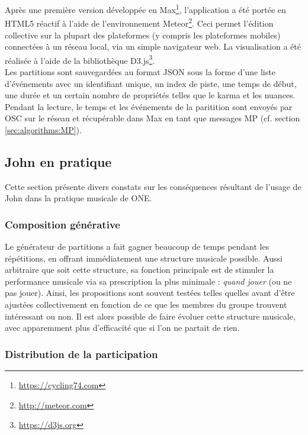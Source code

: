 \noindent Après une première version développée en Max\footnote{\url{https://cycling74.com}}, l'application a été portée en \gls{HTML5} réactif à l'aide de l'environnement Meteor\footnote{\url{http://meteor.com}}. Ceci permet l'édition collective sur la plupart des plateformes (y compris les plateformes mobiles) connectées à un réseau local, via un simple navigateur web. La visualisation a été réalisée à l'aide de la bibliothèque D3.js\footnote{\url{https://d3js.org}}.\\
\indent Les partitions sont sauvegardées au format \gls{JSON} sous la forme d'une liste d'événements avec un identifiant unique, un index de piste, une temps de début, une durée et un certain nombre de propriétés telles que le karma et les nuances. Pendant la lecture, le temps et les événements de la paritition sont envoyés par \gls{OSC} sur le réseau et récupérable dans Max en tant que messages MP (cf. section \ref{sec:algorithms:MP}).

\subsection{John en pratique}
\noindent Cette section présente divers constats sur les conséquences résultant de l'usage de John dans la pratique musicale de ONE.

\subsubsection{Composition générative}

\noindent Le générateur de partitions a fait gagner beaucoup de temps pendant les répétitions, en offrant immédiatement une structure musicale possible. Aussi arbitraire que soit cette structure, sa fonction principale est de stimuler la performance musicale via sa prescription la plus minimale : \textit{quand jouer} (ou ne pas jouer). Ainsi, les propositions sont souvent testées telles quelles avant d'être ajustées collectivement en fonction de ce que les membres du groupe trouvent intéressant ou non. Il est alors possible de faire évoluer cette structure musicale, avec apparemment plus d'efficacité que si l'on ne partait de rien.

\subsubsection{Distribution de la participation}

